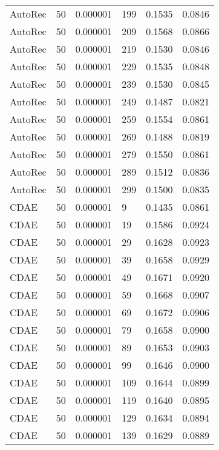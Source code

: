 \begin{tabular}{llrlrr}
 AutoRec &   50 &  0.000001 &   199 &  0.1535 &       0.0846 \\
 AutoRec &   50 &  0.000001 &   209 &  0.1568 &       0.0866 \\
 AutoRec &   50 &  0.000001 &   219 &  0.1530 &       0.0846 \\
 AutoRec &   50 &  0.000001 &   229 &  0.1535 &       0.0848 \\
 AutoRec &   50 &  0.000001 &   239 &  0.1530 &       0.0845 \\
 AutoRec &   50 &  0.000001 &   249 &  0.1487 &       0.0821 \\
 AutoRec &   50 &  0.000001 &   259 &  0.1554 &       0.0861 \\
 AutoRec &   50 &  0.000001 &   269 &  0.1488 &       0.0819 \\
 AutoRec &   50 &  0.000001 &   279 &  0.1550 &       0.0861 \\
 AutoRec &   50 &  0.000001 &   289 &  0.1512 &       0.0836 \\
 AutoRec &   50 &  0.000001 &   299 &  0.1500 &       0.0835 \\
    CDAE &   50 &  0.000001 &     9 &  0.1435 &       0.0861 \\
    CDAE &   50 &  0.000001 &    19 &  0.1586 &       0.0924 \\
    CDAE &   50 &  0.000001 &    29 &  0.1628 &       0.0923 \\
    CDAE &   50 &  0.000001 &    39 &  0.1658 &       0.0929 \\
    CDAE &   50 &  0.000001 &    49 &  0.1671 &       0.0920 \\
    CDAE &   50 &  0.000001 &    59 &  0.1668 &       0.0907 \\
    CDAE &   50 &  0.000001 &    69 &  0.1672 &       0.0906 \\
    CDAE &   50 &  0.000001 &    79 &  0.1658 &       0.0900 \\
    CDAE &   50 &  0.000001 &    89 &  0.1653 &       0.0903 \\
    CDAE &   50 &  0.000001 &    99 &  0.1646 &       0.0900 \\
    CDAE &   50 &  0.000001 &   109 &  0.1644 &       0.0899 \\
    CDAE &   50 &  0.000001 &   119 &  0.1640 &       0.0895 \\
    CDAE &   50 &  0.000001 &   129 &  0.1634 &       0.0894 \\
    CDAE &   50 &  0.000001 &   139 &  0.1629 &       0.0889 \\

\end{tabular}
